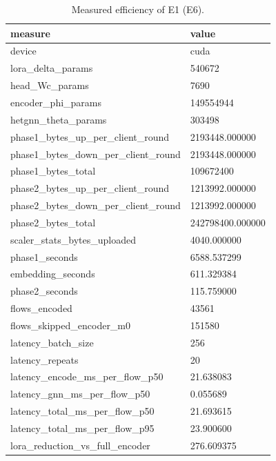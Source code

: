 \begin{table}[htbp]
\centering
\caption{Measured efficiency of E1 (E6).}
\label{Tab_R_Efficiency}
\footnotesize
\begin{tabular}{ll}
\toprule
measure & value \\
\midrule
device & cuda \\
lora\_delta\_params & 540672 \\
head\_Wc\_params & 7690 \\
encoder\_phi\_params & 149554944 \\
hetgnn\_theta\_params & 303498 \\
phase1\_bytes\_up\_per\_client\_round & 2193448.000000 \\
phase1\_bytes\_down\_per\_client\_round & 2193448.000000 \\
phase1\_bytes\_total & 109672400 \\
phase2\_bytes\_up\_per\_client\_round & 1213992.000000 \\
phase2\_bytes\_down\_per\_client\_round & 1213992.000000 \\
phase2\_bytes\_total & 242798400.000000 \\
scaler\_stats\_bytes\_uploaded & 4040.000000 \\
phase1\_seconds & 6588.537299 \\
embedding\_seconds & 611.329384 \\
phase2\_seconds & 115.759000 \\
flows\_encoded & 43561 \\
flows\_skipped\_encoder\_m0 & 151580 \\
latency\_batch\_size & 256 \\
latency\_repeats & 20 \\
latency\_encode\_ms\_per\_flow\_p50 & 21.638083 \\
latency\_gnn\_ms\_per\_flow\_p50 & 0.055689 \\
latency\_total\_ms\_per\_flow\_p50 & 21.693615 \\
latency\_total\_ms\_per\_flow\_p95 & 23.900600 \\
lora\_reduction\_vs\_full\_encoder & 276.609375 \\
\bottomrule
\end{tabular}
\end{table}
